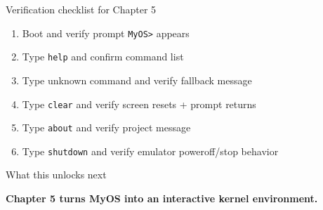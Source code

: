 \documentclass[aspectratio=169]{beamer}
\begin{document}
\begin{frame}{Verification checklist for Chapter 5}
  \begin{enumerate}
    \item Boot and verify prompt \texttt{MyOS>} appears
    \item Type \texttt{help} and confirm command list
    \item Type unknown command and verify fallback message
    \item Type \texttt{clear} and verify screen resets + prompt returns
    \item Type \texttt{about} and verify project message
    \item Type \texttt{shutdown} and verify emulator poweroff/stop behavior
  \end{enumerate}
\end{frame}

\begin{frame}{What this unlocks next}
  \vspace{8pt}
  \begin{center}
    \Large \textbf{Chapter 5 turns MyOS into an interactive kernel environment.}
  \end{center}
\end{frame}
\end{document}
